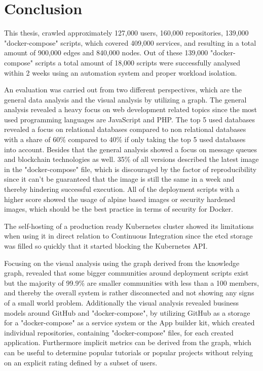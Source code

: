 \chapter{Conclusion}
\label{sec:conclusion}
This thesis, crawled approximately 127,000 users, 160,000 repositories, 139,000 "docker-compose" scripts, which covered 409,000 services, and resulting in a total amount of 900,000 edges and 840,000 nodes.
Out of these 139,000 "docker-compose" scripts a total amount of 18,000 scripts were successfully analysed within 2 weeks using an automation system and proper workload isolation.

An evaluation was carried out from two different perspectives, which are the general data analysis and the visual analysis by utilizing a graph.
The general analysis revealed a heavy focus on web development related topics since the most used programming languages are JavaScript and PHP. The top 5 used databases revealed a focus on relational databases compared to non relational databases with a share of 60\% compared to 40\% if only taking the top 5 used databases into account. Besides that the general analysis showed a focus on message queues and blockchain technologies as well.
35\% of all versions described the latest image in the "docker-compose" file, which is discouraged by the factor of reproducibility since it can't be guaranteed that the image is still the same in a week and thereby hindering successful execution.
All of the deployment scripts with a higher score showed the usage of alpine based images or security hardened images, which should be the best practice in terms of security for Docker.

The self-hosting of a production ready Kubernetes cluster showed its limitations when using it in direct relation to Continuous Integration since the etcd storage was filled so quickly that it started blocking the Kubernetes API.

Focusing on the visual analysis using the graph derived from the knowledge graph, revealed that some bigger communities around deployment scripts exist but the majority of 99.9\% are smaller communities with less than a 100 members, and thereby the overall system is rather disconnected and not showing any signs of a small world problem. Additionally the visual analysis revealed business models around GitHub and "docker-compose", by utilizing GitHub as a storage for a "docker-compose" as a service system or the App builder kit, which created individual repositories, containing "docker-compose" files, for each created application. Furthermore implicit metrics can be derived from the graph, which can be useful to determine popular tutorials or popular projects without relying on an explicit rating defined by a subset of users.

